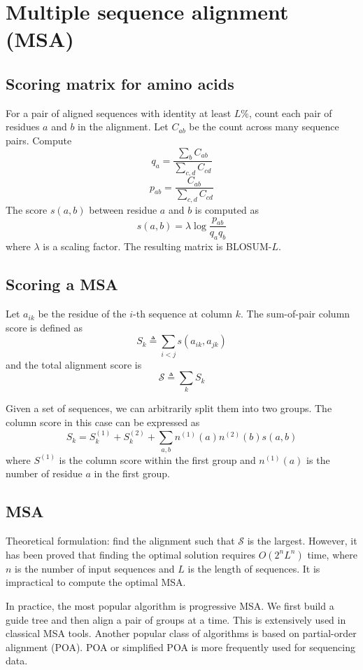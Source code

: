 \documentclass[10pt]{article}
\begin{document}
\newpage

\section{Multiple sequence alignment (MSA)}

\subsection{Scoring matrix for amino acids}

For a pair of aligned sequences with identity at least $L\%$, count each pair of
residues $a$ and $b$ in the alignment. Let $C_{ab}$ be the count across many
sequence pairs. Compute
$$
q_a=\frac{\sum_b C_{ab}}{\sum_{c,d}C_{cd}}
$$
$$
p_{ab}=\frac{C_{ab}}{\sum_{c,d}C_{cd}}
$$
The score $s(a,b)$ between residue $a$ and $b$ is computed as
$$
s(a,b)=\lambda\log\frac{p_{ab}}{q_aq_b}
$$
where $\lambda$ is a scaling factor. The resulting matrix is BLOSUM-$L$.

\subsection{Scoring a MSA}

Let $a_{ik}$ be the residue of the $i$-th sequence at column $k$. The
sum-of-pair column score is defined as
$$
S_k\triangleq\sum_{i<j}s(a_{ik},a_{jk})
$$
and the total alignment score is
$$
\mathcal{S}\triangleq\sum_k S_k
$$

Given a set of sequences, we can arbitrarily split them into two groups. The
column score in this case can be expressed as
$$
S_k=S^{(1)}_k+S^{(2)}_k+\sum_{a,b}n^{(1)}(a)n^{(2)}(b)s(a,b)
$$
where $S^{(1)}$ is the column score within the first group and $n^{(1)}(a)$ is
the number of residue $a$ in the first group.

\subsection{MSA}

Theoretical formulation: find the alignment such that $\mathcal{S}$ is the
largest. However, it has been proved that finding the optimal solution requires
$O(2^nL^n)$ time, where $n$ is the number of input sequences and $L$ is the
length of sequences. It is impractical to compute the optimal MSA.

In practice, the most popular algorithm is progressive MSA. We first build a
guide tree and then align a pair of groups at a time. This is extensively used
in classical MSA tools. Another popular class of algorithms is based on
partial-order alignment (POA). POA or simplified POA is more frequently used
for sequencing data.
\end{document}
